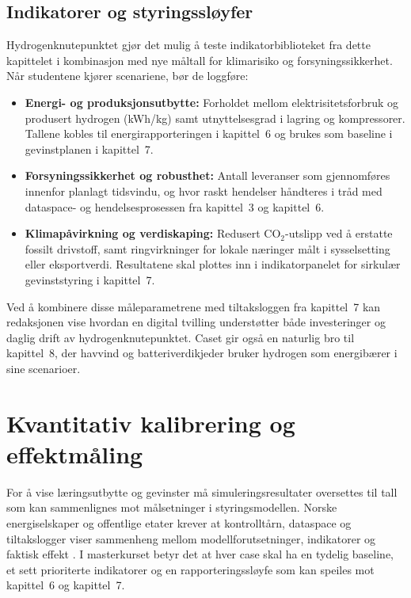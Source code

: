 \subsection{Indikatorer og styringssløyfer}
Hydrogenknutepunktet gjør det mulig å teste indikatorbiblioteket fra dette kapittelet i kombinasjon med nye måltall for klimarisiko og forsyningssikkerhet. Når studentene kjører scenariene, bør de loggføre:
\begin{itemize}
    \item \textbf{Energi- og produksjonsutbytte:} Forholdet mellom elektrisitetsforbruk og produsert hydrogen (kWh/kg) samt utnyttelsesgrad i lagring og kompressorer. Tallene kobles til energirapporteringen i kapittel~6 og brukes som baseline i gevinstplanen i kapittel~7.
    \item \textbf{Forsyningssikkerhet og robusthet:} Antall leveranser som gjennomføres innenfor planlagt tidsvindu, og hvor raskt hendelser håndteres i tråd med dataspace- og hendelsesprosessen fra kapittel~3 og kapittel~6.
    \item \textbf{Klimapåvirkning og verdiskaping:} Redusert CO$_2$-utslipp ved å erstatte fossilt drivstoff, samt ringvirkninger for lokale næringer målt i sysselsetting eller eksportverdi. Resultatene skal plottes inn i indikatorpanelet for sirkulær gevinststyring i kapittel~7.
\end{itemize}
Ved å kombinere disse måleparametrene med tiltaksloggen fra kapittel~7 kan redaksjonen vise hvordan en digital tvilling understøtter både investeringer og daglig drift av hydrogenknutepunktet. Caset gir også en naturlig bro til kapittel~8, der havvind og batteriverdikjeder bruker hydrogen som energibærer i sine scenarioer.

\section{Kvantitativ kalibrering og effektmåling}
For å vise læringsutbytte og gevinster må simuleringsresultater oversettes til tall som kan sammenlignes mot målsetninger i styringsmodellen. Norske energiselskaper og offentlige etater krever at kontrolltårn, dataspace og tiltakslogger viser sammenheng mellom modellforutsetninger, indikatorer og faktisk effekt \citep{energinorge2023beredskap,statnett2024kontrolltarn}. I masterkurset betyr det at hver case skal ha en tydelig baseline, et sett prioriterte indikatorer og en rapporteringssløyfe som kan speiles mot kapittel~6 og kapittel~7.

